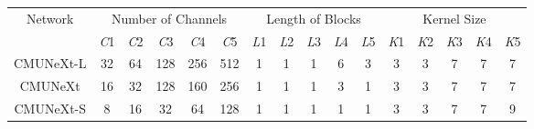 \begin{tabular}{c|ccccc|ccccc|ccccc}
\toprule[1.1pt]
\multirow{2}{*}[-0.3em]{Network} & 
\multicolumn{5}{c|}{Number of Channels} & 
\multicolumn{5}{c|}{Length of Blocks} & 
\multicolumn{5}{c}{Kernel Size} \\

\cmidrule{2-16}
& \textit{C}1 & \textit{C}2 & \textit{C}3 & \textit{C}4 & \textit{C}5 
& \textit{L}1 & \textit{L}2 & \textit{L}3 & \textit{L}4 & \textit{L}5 
& \textit{K}1 & \textit{K}2 & \textit{K}3 & \textit{K}4 & \textit{K}5 \\
\midrule[1.1pt]
CMUNeXt-L      
& 32 &  64 & 128 & 256 & 512 
& 1  &   1 &   1 &   6 &   3 
& 3  &   3 &   7 &   7 &   7 \\
CMUNeXt        
& 16 &  32 & 128 & 160 & 256 
& 1  &   1 &   1 &   3 &   1 
& 3  &   3 &   7 &   7 &   7 \\
CMUNeXt-S      
&  8 &  16 &  32 &  64 & 128 
& 1  &   1 &   1 &   1 &   1 
& 3  &   3 &   7 &   7 &   9 \\
\bottomrule[1.1pt]
\end{tabular}